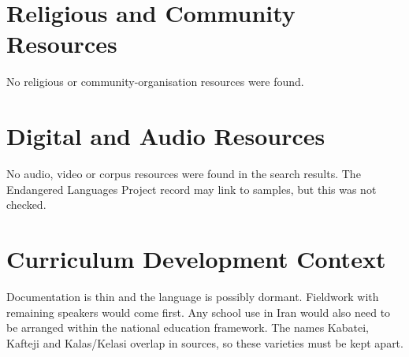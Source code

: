 \documentclass[12pt]{article}
\begin{document}
\section{Religious and Community Resources}
No religious or community-organisation resources were found.

\section{Digital and Audio Resources}
No audio, video or corpus resources were found in the search results. The Endangered Languages Project record may link to samples, but this was not checked.

\section{Curriculum Development Context}
Documentation is thin and the language is possibly dormant. Fieldwork with remaining speakers would come first. Any school use in Iran would also need to be arranged within the national education framework. The names Kabatei, Kafteji and Kalas/Kelasi overlap in sources, so these varieties must be kept apart.
\end{document}
